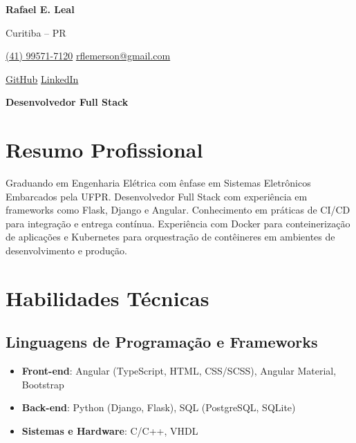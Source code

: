 \documentclass[a4paper,10pt]{article}
\begin{document}

\noindent
\begin{minipage}[t]{0.5\textwidth}
    \textbf{\Large Rafael E. Leal}
    
    \vspace{0.4em}
\end{minipage}%
\begin{minipage}[t]{0.5\textwidth}
    \raggedleft Curitiba -- PR
    
    {\color{blue}} \href{tel:+5541995717120}{\faPhone \space (41) 99571-7120}
    {\color{blue}} \href{mailto:rflemerson@gmail.com}{\faEnvelope \space rflemerson@gmail.com}
    
    \vspace{0.2em}
    \quad
    {\color{blue}} \href{https://github.com/rflemerson}{\faGithub \space GitHub} \quad
    {\color{blue}} \href{https://www.linkedin.com/in/rflmerson/}{\faLinkedin \space LinkedIn} \\
\end{minipage}

\vspace{1em}

\begin{center}
    \textbf{\Large Desenvolvedor Full Stack}
\end{center}
\vspace{0.5em}

\section*{Resumo Profissional}
\vspace{0.6em}

{Graduando em Engenharia Elétrica com ênfase em Sistemas Eletrônicos Embarcados pela UFPR. Desenvolvedor Full Stack com experiência em frameworks como Flask, Django e Angular. Conhecimento em práticas de CI/CD para integração e entrega contínua. Experiência com Docker para conteinerização de aplicações e Kubernetes para orquestração de contêineres em ambientes de desenvolvimento e produção.}

\vspace{0.6em}

\section*{Habilidades Técnicas}
\vspace{0.6em}

\subsection*{Linguagens de Programação e Frameworks}
\begin{itemize}
    \setlength\itemsep{0em}
    \item \textbf{Front-end}: Angular (TypeScript, HTML, CSS/SCSS), Angular Material, Bootstrap
    \item \textbf{Back-end}: Python (Django, Flask), SQL (PostgreSQL, SQLite)
    \item \textbf{Sistemas e Hardware}: C/C++, VHDL
\end{itemize}
\end{document}
